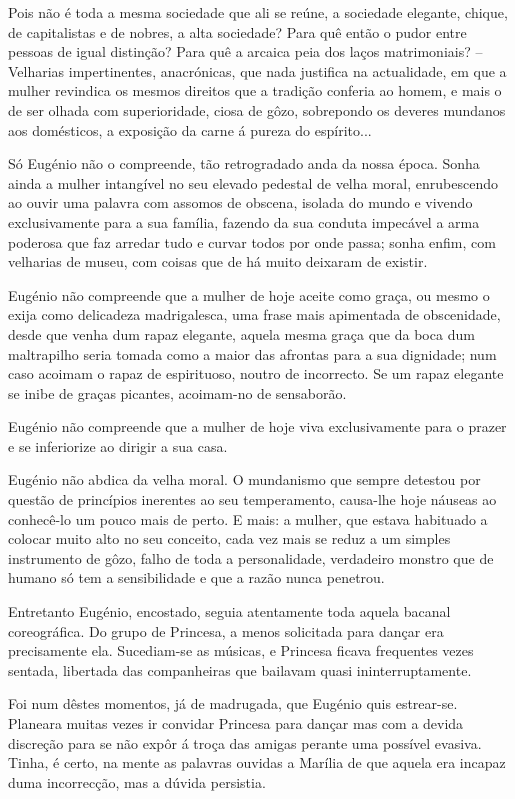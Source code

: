 \documentclass[9pt]{article}
\begin{document}
Pois não é toda a mesma sociedade que ali se reúne, a sociedade elegante, chique, de capitalistas e de nobres, a alta sociedade? Para quê então
o pudor entre pessoas de igual distin\-ção? Para quê a arcaica peia dos laços matrimoniais? -- Ve\-lharias impertinentes, anacrónicas, que nada justifi\-ca na actualidade, em que a mu\-lher revindica os mesmos direitos que a tradi\-ção conferia ao homem, e mais o de ser o\-lhada com superioridade, ciosa
de gôzo, sobrepondo os deveres mundanos aos domésticos, a exposi\-ção da carne
á pureza do espírito...

Só Eugé\-nio não o compreende, tão retrogradado anda da nossa épo\-ca. Sonha ainda a mu\-lher intangível no seu elevado pedestal de ve\-lha moral, enrubescendo ao ouvir uma palavra com assomos de obscena, isolada do mundo
e vivendo exclusivamente para a sua fa\-mí\-lia, fazendo da sua conduta impecável a arma poderosa que faz arredar tudo e curvar todos por onde passa;
sonha enfim, com ve\-lharias de museu, com coisas que de há muito deixaram de
existir.

Eugé\-nio não compreende que a mu\-lher de hoje aceite como graça, ou mesmo o exija como delicadeza madrigalesca, uma frase mais apimentada de obscenidade, desde que venha dum rapaz elegante, aquela mesma graça que da boca
dum maltrapi\-lho seria tomada como a maior das afrontas para a sua dignidade;
num caso acoimam o rapaz de espirituoso, noutro de incorrecto. Se um rapaz
elegante se inibe de graças picantes, acoimam-no de sensaborão.

Eugé\-nio não compreende que a mu\-lher de hoje viva exclusivamente para
o prazer e se inferiorize ao dirigir a sua casa.

Eugé\-nio não abdica da ve\-lha moral. O mundanismo que sempre detestou
por questão de princípios inerentes ao seu temperamento, cau\-sa-lhe hoje náuseas
ao conhecê-lo um pouco mais de perto. E mais: a mu\-lher, que estava
habituado a colocar muito alto no seu conceito, cada vez mais se reduz a um simples
instrumento de gôzo, fa\-lho de toda a personalidade, verdadeiro monstro que de humano
só tem a sensibilidade e que a razão nunca penetrou.

Entretanto Eugé\-nio, encostado, seguia atentamente toda aquela bacanal
coreográfi\-ca. Do grupo de Princesa, a menos solicitada para dan\-çar era precisamente ela. Sucediam-se as músicas, e Princesa fi\-cava frequentes vezes
sentada, libertada das companheiras que bailavam quasi ininterruptamente.

Foi num dêstes momentos, já de madrugada, que Eugé\-nio quis es\-tre\-ar-se.
Planeara muitas vezes  ir convidar Princesa para dan\-çar mas com a devida
discre\-ção para se não expôr á troça das amigas perante uma possível evasiva.
Tinha, é certo, na mente as palavras ouvidas a Marília de que aquela era incapaz duma incorrec\-ção, mas a dúvida persistia.
\end{document}
